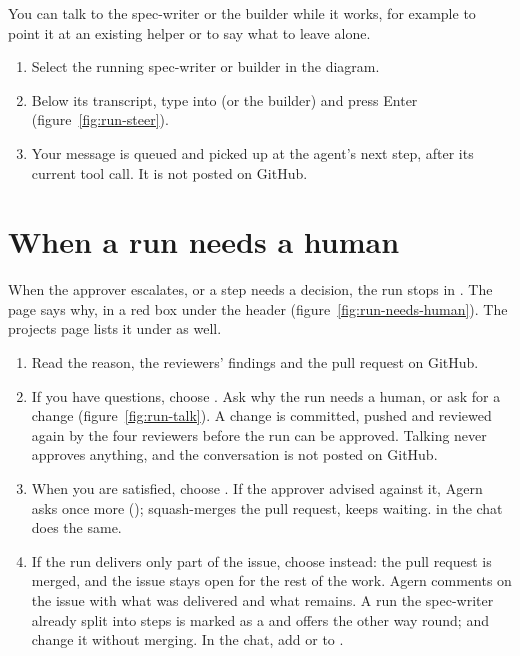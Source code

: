 You can talk to the spec-writer or the builder while it works, for example to point it at an
existing helper or to say what to leave alone.

\begin{enumerate}
  \item Select the running spec-writer or builder in the diagram.
  \item Below its transcript, type into  (or the builder) and
    press Enter (figure~\ref{fig:run-steer}).
  \item Your message is queued and picked up at the agent's next step, after its current tool call.
    It is not posted on GitHub.
\end{enumerate}


\section{When a run needs a human}\label{sec:needs-human}

When the approver escalates, or a step needs a decision, the run stops in . The
page says why, in a red box under the header (figure~\ref{fig:run-needs-human}). The projects
page lists it under  as well.

\begin{enumerate}
  \item Read the reason, the reviewers' findings and the pull request on GitHub.
  \item If you have questions, choose . Ask why the run needs a human, or ask
    for a change (figure~\ref{fig:run-talk}). A change is committed, pushed and reviewed again by
    the four reviewers before the run can be approved. Talking never approves anything, and the
    conversation is not posted on GitHub.
  \item When you are satisfied, choose . If the approver advised against it,
    Agern asks once more ();  squash-merges
    the pull request,  keeps waiting.  in the chat does the same.
  \item If the run delivers only part of the issue, choose  instead: the
    pull request is merged, and the issue stays open for the rest of the work. Agern comments on the
    issue with what was delivered and what remains. A run the spec-writer already split into steps is
    marked as a  and offers  the other way round;  and  change it without merging. In the chat, add
     or  to .
\end{enumerate}

